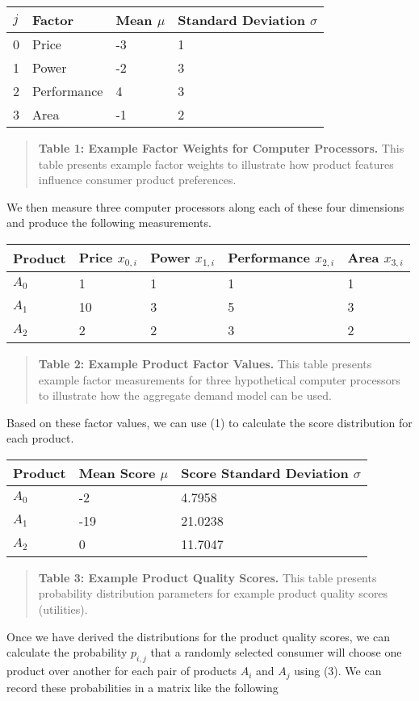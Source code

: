 \documentclass[]{article}
\begin{document}
\begin{longtable}[]{@{}llll@{}}
\toprule
\(j\) & Factor & Mean \(\mu\) & Standard Deviation
\(\sigma\)\tabularnewline
\midrule
\endhead
0 & Price & -3 & 1\tabularnewline
1 & Power & -2 & 3\tabularnewline
2 & Performance & 4 & 3\tabularnewline
3 & Area & -1 & 2\tabularnewline
\bottomrule
\end{longtable}

\begin{quote}
\textbf{Table 1: Example Factor Weights for Computer Processors.} This
table presents example factor weights to illustrate how product features
influence consumer product preferences.
\end{quote}

We then measure three computer processors along each of these four
dimensions and produce the following measurements.

\begin{longtable}[]{@{}lllll@{}}
\toprule
Product & Price \(x_{0,i}\) & Power \(x_{1,i}\) & Performance
\(x_{2,i}\) & Area \(x_{3,i}\)\tabularnewline
\midrule
\endhead
\(A_0\) & 1 & 1 & 1 & 1\tabularnewline
\(A_1\) & 10 & 3 & 5 & 3\tabularnewline
\(A_2\) & 2 & 2 & 3 & 2\tabularnewline
\bottomrule
\end{longtable}

\begin{quote}
\textbf{Table 2: Example Product Factor Values.} This table presents
example factor measurements for three hypothetical computer processors
to illustrate how the aggregate demand model can be used.
\end{quote}

Based on these factor values, we can use (1) to calculate the score
distribution for each product.

\begin{longtable}[]{@{}lll@{}}
\toprule
Product & Mean Score \(\mu\) & Score Standard Deviation
\(\sigma\)\tabularnewline
\midrule
\endhead
\(A_0\) & -2 & 4.7958\tabularnewline
\(A_1\) & -19 & 21.0238\tabularnewline
\(A_2\) & 0 & 11.7047\tabularnewline
\bottomrule
\end{longtable}

\begin{quote}
\textbf{Table 3: Example Product Quality Scores.} This table presents
probability distribution parameters for example product quality scores
(utilities).
\end{quote}

Once we have derived the distributions for the product quality scores,
we can calculate the probability \(p_{i,j}\) that a randomly selected
consumer will choose one product over another for each pair of products
\(A_i\) and \(A_j\) using (3). We can record these probabilities in a
matrix like the following
\end{document}
